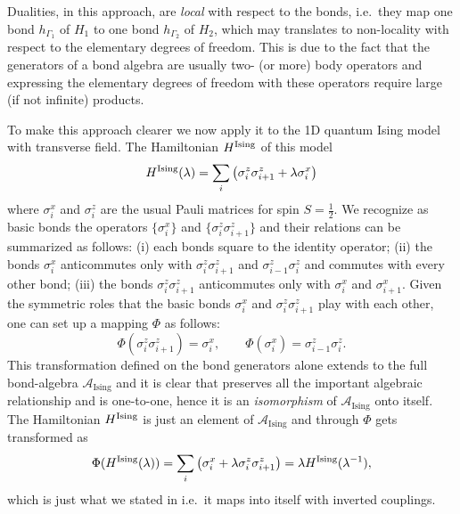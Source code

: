 Dualities, in this approach, are \emph{local} with respect to the bonds, i.e.~they map one bond $h_{\Gamma_1}$ of $H_1$ to one bond $h_{\Gamma_2}$ of $H_2$, which may translates to non-locality with respect to the elementary degrees of freedom.
This is due to the fact that the generators of a bond algebra are usually two- (or more) body operators and expressing the elementary degrees of freedom with these operators require large (if not infinite) products.

To make this approach clearer we now apply it to the 1D quantum Ising model with transverse field.
The Hamiltonian $H^{\text{Ising}}$ of this model
\begin{equation}
    \HIsing(\lambda) = \sum_{i}  \pqty{ \sigma_i^z \sigma_{i+1}^z + \lambda \sigma_i^x }
\end{equation}
where $\sigma^x_i$ and $\sigma^z_i$ are the usual Pauli matrices for spin $S= \frac{1}{2} $.
We recognize as basic bonds the operators $\{\sigma^x_i\}$ and $\{\sigma^z_i \sigma^z_{i+1}\}$ and their relations can be summarized as follows: (i) each bonds square to the identity operator; (ii) the bonds $\sigma_i^x$ anticommutes only with $\sigma^z_i \sigma^z_{i+1}$ and $\sigma^z_{i-1} \sigma^z_i$ and commutes with every other bond; (iii) the bonds $\sigma^z_i \sigma^z_{i+1}$ anticommutes only with $\sigma^x_i$ and $\sigma^x_{i+1}$.
Given the symmetric roles that the basic bonds $\sigma^x_i$ and $\sigma^z_i \sigma^z_{i+1}$ play with each other, one can set up a mapping $\Phi$ as follows:
\begin{equation}
    \Phi(\sigma^z_i \sigma^z_{i+1}) = \sigma^x_i, \qquad
    \Phi(\sigma^x_i) = \sigma^z_{i-1} \sigma^z_i.
    \label{eq:duality_ising}
\end{equation}
This transformation defined on the bond generators alone extends to the full bond-algebra $\mathcal{A}_{\text{Ising}}$ and it is clear that preserves all the important algebraic relationship and is one-to-one, hence it is an \emph{isomorphism} of $\mathcal{A}_{\text{Ising}}$ onto itself.
The Hamiltonian $H^{\text{Ising}}$ is just an element of $\mathcal{A}_{\text{Ising}}$ and through $\Phi$ gets transformed as
\begin{equation}
    \Phi( \HIsing(\lambda) )
    = \sum_{i} \pqty{ \sigma_i^x + \lambda \sigma^z_{i} \sigma^z_{i+1}} \\
    = \lambda \HIsing(\lambda^{-1}),
\end{equation}
which is just what we stated in 
i.e.~it maps into itself with inverted couplings.

